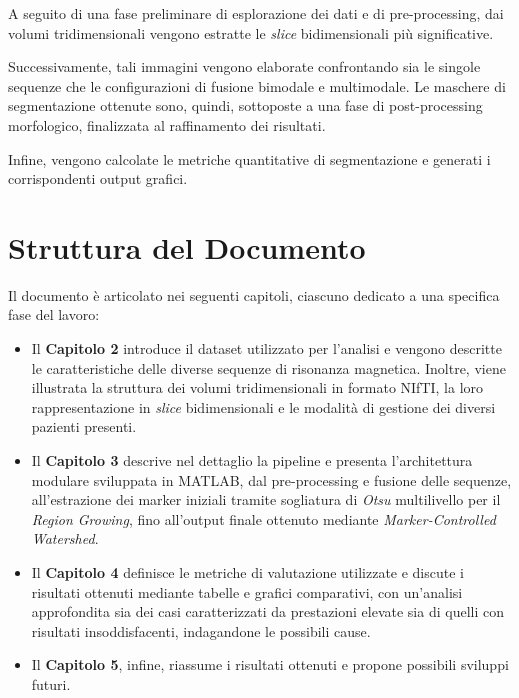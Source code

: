 A seguito di una fase preliminare di esplorazione dei dati e di pre-processing, dai volumi tridimensionali vengono estratte le \textit{slice} bidimensionali più significative.

Successivamente, tali immagini vengono elaborate confrontando sia le singole sequenze che le configurazioni di fusione bimodale e multimodale. Le maschere di segmentazione ottenute sono, quindi, sottoposte a una fase di post-processing morfologico, finalizzata al raffinamento dei risultati.

Infine, vengono calcolate le metriche quantitative di segmentazione e generati i corrispondenti output grafici.

\section{Struttura del Documento}
Il documento è articolato nei seguenti capitoli, ciascuno dedicato a una specifica fase del lavoro:

\begin{itemize}
    \item Il \textbf{Capitolo 2} introduce il dataset utilizzato per l’analisi e vengono descritte le caratteristiche delle diverse sequenze di risonanza magnetica. Inoltre, viene illustrata la struttura dei volumi tridimensionali in formato NIfTI, la loro rappresentazione in \textit{slice} bidimensionali e le modalità di gestione dei diversi pazienti presenti.

    \item Il \textbf{Capitolo 3} descrive nel dettaglio la pipeline e presenta l’architettura modulare sviluppata in MATLAB, dal pre-processing e fusione delle sequenze, all’estrazione dei marker iniziali tramite sogliatura di \textit{Otsu} multilivello per il \textit{Region Growing}, fino all’output finale ottenuto mediante \textit{Marker-Controlled Watershed}.

    \item Il \textbf{Capitolo 4} definisce le metriche di valutazione utilizzate e discute i risultati ottenuti mediante tabelle e grafici comparativi, con un’analisi approfondita sia dei casi caratterizzati da prestazioni elevate sia di quelli con risultati insoddisfacenti, indagandone le possibili cause.

    \item Il \textbf{Capitolo 5}, infine, riassume i risultati ottenuti e propone possibili sviluppi futuri.
\end{itemize}